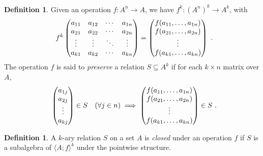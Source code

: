 \documentclass[11pt, a4paper, twoside,leqno]{amsart}
\numberwithin{equation}{section}
\theoremstyle{plain}
\theoremstyle{definition}
\newtheorem{Defn}[Thm]{Definition}
\begin{document}
\begin{Defn}
  \label{def:compatibility-matrix}
  Given an operation \(f \colon A^{n} \rightarrow A\), we have \(f^{k}
  \colon (A^{n})^{k} \rightarrow A^{k}\), with
  \begin{equation*}
    f^{k}
    \begin{pmatrix}
      a_{11} & a_{12} & \cdots & a_{1n} \\
      a_{21} & a_{22} & \cdots & a_{2n} \\
      \vdots  & \vdots  & \ddots & \vdots  \\
      a_{k1} & a_{k2} & \cdots & a_{kn} 
    \end{pmatrix}
    =
    \begin{pmatrix}
      f(a_{11}, \dotsc , a_{1n}) \\
      f(a_{21}, \dotsc , a_{2n}) \\
      \vdots  \\
      f(a_{k1}, \dotsc , a_{kn})
    \end{pmatrix}\rlap{ .}
  \end{equation*}
  The operation \(f\) is said to \emph{preserve}
  a relation \(S \subseteq A^{k}\) if for each \(k\times n\) matrix over \(A\),
  \begin{equation*}
    \begin{pmatrix}
      a_{1j} \\
      a_{2j} \\
      \vdots \\
      a_{kj}
    \end{pmatrix} \in S  \quad (\forall j\in n)
    \implies
    \begin{pmatrix}
      f(a_{11}, \dotsc , a_{1n}) \\
      f(a_{21}, \dotsc , a_{2n}) \\
      \vdots  \\
      f(a_{k1}, \dotsc , a_{kn})
    \end{pmatrix} \in S  \rlap{ .}
  \end{equation*}
\end{Defn}



\begin{Defn}
  \label{def:rel-closed-op}
  A \(k\)-ary 
  relation \(S\) on a set \(A\) is \emph{closed} under an operation
  \(f\) if \(S\) is a subalgebra of
  \(\langle A; f \rangle^{k}\) under the pointwise structure.
\end{Defn}
\end{document}
